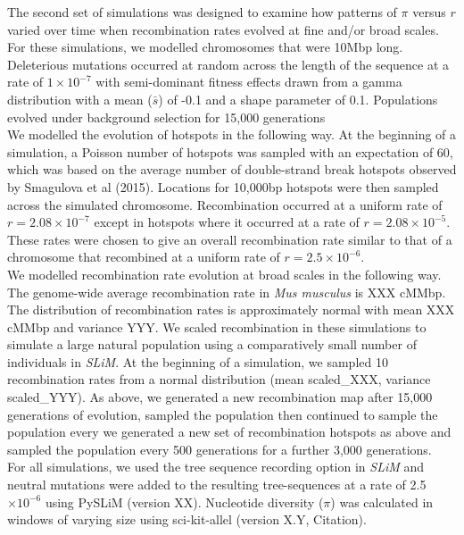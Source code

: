 \documentclass[11pt,twoside,lineno]{GSA_format}
\begin{document}
The second set of simulations was designed to examine how patterns of $\pi$ versus $r$ varied over time when recombination rates evolved at fine and/or broad scales. For these simulations, we modelled chromosomes that were 10Mbp long. Deleterious mutations occurred at random across the length of the sequence at a rate of $1\times10^{-7}$ with semi-dominant fitness effects drawn from a gamma distribution with a mean ($\bar{s}$) of -0.1 and a shape parameter of 0.1. Populations evolved under background selection for 15,000 generations  \\

We modelled the evolution of hotspots in the following way. At the beginning of a simulation, a Poisson number of hotspots was sampled with an expectation of 60, which was based on the average number of double-strand break hotspots observed by Smagulova et al (2015). Locations for 10,000bp hotspots were then sampled across the simulated chromosome. Recombination occurred at a uniform rate of $r=2.08\times10^{-7}$ except in hotspots where it occurred at a rate of $r=2.08\times10^{-5}$. These rates were chosen to give an overall recombination rate similar to that of a chromosome that recombined at a uniform rate of $r=2.5\times10^{-6}$. \\

We modelled recombination rate evolution at broad scales in the following way. The genome-wide average recombination rate in \textit{Mus musculus} is XXX cM\/Mbp. The distribution of recombination rates is approximately normal with mean XXX cM\/Mbp and variance YYY. We scaled recombination in these simulations to simulate a large natural population using a comparatively small number of individuals in \textit{SLiM}. At the beginning of a simulation, we sampled  10 recombination rates from a normal distribution (mean scaled\_XXX, variance scaled\_YYY). As above, we generated a new recombination map after 15,000 generations of evolution, sampled the population then continued to sample the population every 
we generated a new set of recombination hotspots as above and sampled the population every 500 generations for a further 3,000 generations. \\

For all simulations, we used the tree sequence recording option in \textit{SLiM} and neutral mutations were added to the resulting tree-sequences at a rate of 2.5$\times10^{-6}$ using PySLiM (version XX). Nucleotide diversity ($\pi$) was calculated in windows of varying size using sci-kit-allel (version X.Y, Citation).
\end{document}
